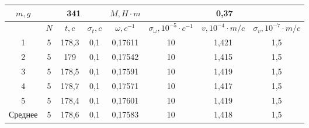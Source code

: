 \documentclass[a4paper, 12pt]{article}%
\begin{document}
\begin{enumerate}
\begin{center}
\begin{tabular}{|c|c|c|c|c|c|c|c|}
\hline
$m, g$  & \multicolumn{3}{c|}{341}     & $M, H \cdot m$   & \multicolumn{3}{c|}{0,37}                                                                        \\ \hline
        & $N$ & $t, c$ & $\sigma_t, c$ & $\omega, c^{-1}$ & $\sigma_{\omega}, 10^{-5} \cdot c^{-1}$ & $v, 10^{-4} \cdot m/c$ & $\sigma_v, 10^{-7} \cdot m/c$ \\ \hline
1       & 5   & 178,3  & 0,1           & 0,17611          & 10                                      & 1,421                  & 1,5                           \\ \hline
2       & 5   & 179    & 0,1           & 0,17542          & 10                                      & 1,415                  & 1,5                           \\ \hline
3       & 5   & 178,5  & 0,1           & 0,17591          & 10                                      & 1,419                  & 1,5                           \\ \hline
4       & 5   & 178,7  & 0,1           & 0,17571          & 10                                      & 1,417                  & 1,5                           \\ \hline
5       & 5   & 178,4  & 0,1           & 0,17601          & 10                                      & 1,419                  & 1,5                           \\ \hline
Среднее & 5   & 178,6  & 0,1           & 0,17583          & 10                                      & 1,418                  & 1,5                           \\ \hline
\end{tabular}


\end{center}
\end{enumerate}
\end{document}
